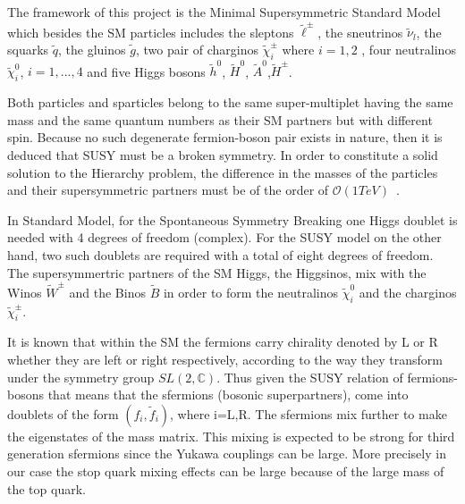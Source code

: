 \documentclass[12pt,a4paper]{report}
\begin{document}
The framework of this project is the Minimal Supersymmetric Standard Model which besides the SM particles 
includes the sleptons $\tilde{\ell}^{\pm}$, the sneutrinos $\tilde{\nu}_{l}$, the squarks $\tilde{q}$, the 
gluinos $\tilde{g}$, two pair of charginos $\tilde{\chi}^{\pm}_{i}$ where $i=1,2$ ,  four neutralinos 
$\tilde{\chi}^{0}_{i}$, $i=1,...,4$ and five Higgs bosons $\tilde{h}^{0}$, $\tilde{H}^{0}$,
$\tilde{A}^{0}$,$\tilde{H}^{\pm}$.

Both particles and sparticles belong to the same super-multiplet having the same mass and the same quantum 
numbers as their SM partners but with different spin. Because no such degenerate fermion-boson pair exists 
in nature,
then it is deduced that SUSY must be a broken symmetry. In order to constitute a solid solution to the 
Hierarchy problem, the difference in the masses of the particles and their supersymmetric partners 
must be of the order of $\mathcal{O}(1  TeV) $~\cite{nagashima2014beyond}.

In Standard Model, for the Spontaneous Symmetry Breaking one Higgs doublet is needed with 4 degrees of 
freedom (complex). For the SUSY model on the other hand, two such doublets are required with a total of eight 
degrees of freedom. The supersymmertric partners of the SM Higgs, the Higgsinos, mix with the Winos 
$\tilde{W}^{\pm}$ and the 
Binos $\tilde{B}$ in order to form the neutralinos $\tilde{\chi}_{i}^{0}$ and the charginos 
$\tilde{\chi}_{i}^{\pm}$.  



It is known that within the SM the fermions carry chirality denoted by L or R whether they are left or right 
respectively, according to the way they transform under the symmetry group $SL(2,\mathbb{C})$. Thus given 
the SUSY relation of fermions-bosons that means that the sfermions  (bosonic superpartners), come into 
doublets of the form $(f_{i},\tilde{f}_{i})$, where i=L,R. The sfermions mix further to make the eigenstates
of the mass matrix. This mixing is expected to be strong for third generation sfermions since the Yukawa 
couplings can be large. More precisely in our case the stop quark mixing effects can be large because
of the large mass of the top quark.
\end{document}
